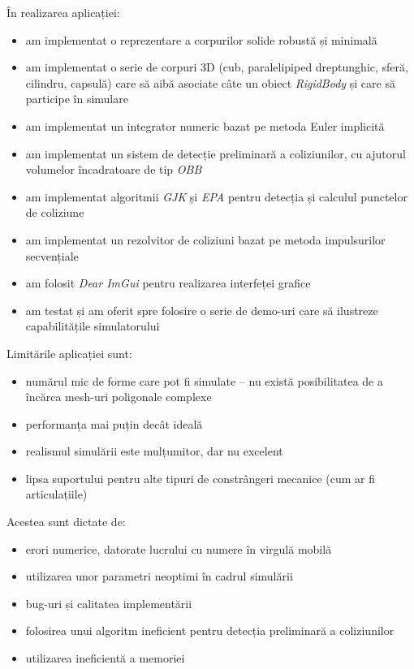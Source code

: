 \documentclass[12pt,a4paper]{report}
\begin{document}
În realizarea aplicației:
	\begin{itemize}
		\item am implementat o reprezentare a corpurilor solide robustă și minimală
		\item am implementat o serie de corpuri 3D (cub, paralelipiped dreptunghic, sferă, cilindru, capsulă) care să aibă asociate câte un obiect \textit{RigidBody} și care să participe în simulare
		\item am implementat un integrator numeric bazat pe metoda Euler implicită
		\item am implementat un sistem de detecție preliminară a coliziunilor, cu ajutorul volumelor încadratoare de tip \textit{OBB}
		\item am implementat algoritmii \textit{GJK} și \textit{EPA} pentru detecția și calculul punctelor de coliziune
		\item am implementat un rezolvitor de coliziuni bazat pe metoda impulsurilor secvențiale
		\item am folosit \textit{Dear ImGui} pentru realizarea interfeței grafice
		\item am testat și am oferit spre folosire o serie de demo-uri care să ilustreze capabilitățile simulatorului
	\end{itemize}

Limitările aplicației sunt:
\begin{itemize}
	\item numărul mic de forme care pot fi simulate -- nu există posibilitatea de a încărca mesh-uri poligonale complexe
	\item performanța mai puțin decât ideală
	\item realismul simulării este mulțumitor, dar nu excelent
	\item lipsa suportului pentru alte tipuri de constrângeri mecanice (cum ar fi articulațiile)
\end{itemize}
Acestea sunt dictate de:
	\begin{itemize}
		\item erori numerice, datorate lucrului cu numere în virgulă mobilă
		\item utilizarea unor parametri neoptimi în cadrul simulării
		\item bug-uri și calitatea implementării
		\item folosirea unui algoritm ineficient pentru detecția preliminară a coliziunilor
		\item utilizarea ineficientă a memoriei
	\end{itemize}
\end{document}
